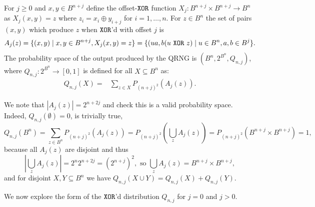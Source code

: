\documentclass{mscs}
\newtheorem{Proposition}[Theorem]{Proposition}
\newcommand{\xor}{\text{ ${\tt XOR}$ }}
\begin{document}
For $j\ge 0$ and $x,y \in B^{n+j}$ define the offset-${\tt XOR}$ function $X_j: B^{n+j} \times B^{n+j} \to B^n$ as $X_j(x,y) = z$ where $z_i = x_i \oplus y_{i+j}$ for $i=1,\dots,n$. For $z \in B^n$ the set of pairs $(x,y)$ which produce $z$ when ${\tt XOR}$'d with offset $j$ is
\[	A_j(z) = \{(x,y) \mid x,y \in B^{n+j}, X_j(x,y)=z \}%
	= \{(ua,b(u \xor z) \mid u \in B^n, a,b\in B^j \}.\]
 The probability space of the output produced by the QRNG is $(B^n,2^{B^n},Q_{n,j})$, where $Q_{n,j}: 2^{B^n} \to [0,1]$ is defined for all $X\subseteq B^n$ as:
\begin{align}\label{QProbDefn}
	Q_{n,j}(X) =& \sum_{z\in X}P_{(n+j)^2}(A_j(z)).
\end{align}

We note that $|A_j(z)| = 2^{n+2j}$ and check this is a valid probability space. Indeed,
	 $Q_{n,j}(\emptyset) = 0$, is trivially true,
	$$Q_{n,j}(B^n) = \sum_{z\in B^n}P_{(n+j)^2}(A_j(z)) = P_{(n+j)^2}\left(\bigcup_z A_j(z)\right) = P_{(n+j)^2}\left(B^{n+j}\times B^{n+j}\right) = 1,$$ because all $A_j(z)$ are disjoint and thus $$|\bigcup_z A_j(z)| = 2^n 2^{n+2j} = (2^{n+j})^2, \mbox{  so  }  \bigcup_z A_j(z) = B^{n+j}\times B^{n+j},$$ and
	for disjoint  $X,Y \subseteq B^n$ we have $ Q_{n,j}(X\cup Y) = Q_{n,j}(X) + Q_{n,j}(Y)$.

We now explore the form of the ${\tt XOR}$'d distribution $Q_{n,j}$  for  $j=0$ and $j>0$.
\end{document}
